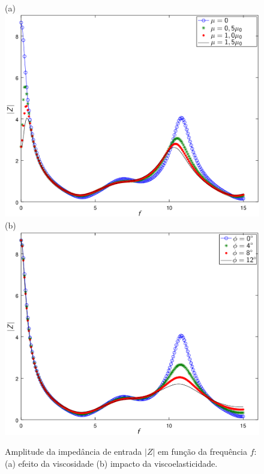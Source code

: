 \documentclass[a4paper,12pt]{monografia}
\theoremstyle{plain}
\theoremstyle{definition}
\theoremstyle{remark}
\begin{document}
\begin{figure}[!htbp]
	\centering
	(a) \\
	\includegraphics[scale=0.7]{figure-result-impedance/fig_viscosity_impedance_new.png}\\
	(b) \\
	\includegraphics[scale=0.7]{figure-result-impedance/fig_viscoelasticity_impedance_new.png}
	\caption{Amplitude da impedância de entrada $|Z|$ em função da frequência $f$: (a) efeito da viscosidade (b) impacto da viscoelasticidade.}
	\label{fig:impedance1}%
\end{figure}
\end{document}
